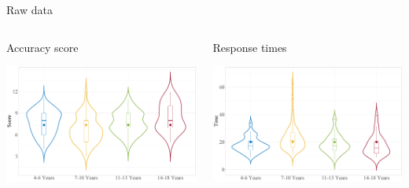 \documentclass{beamer}
\begin{document}
	\begin{frame}{Raw data}
	
	\begin{columns}
	
	\begin{column}{.50\linewidth}
	
	\begin{center}
	Accuracy score
	\end{center}
		\centering
	\includegraphics[width=\linewidth]{img/descrittive_accuratezze.pdf}
		
	\end{column}
	
		\begin{column}{.50\linewidth}
		
			\begin{center}
	Response times
	\end{center}
		\centering
		
			\includegraphics[width=\linewidth]{img/descrittive_tempi.pdf}
	\end{column}
	\end{columns}
	

		
		
		
			\end{frame}
\end{document}
